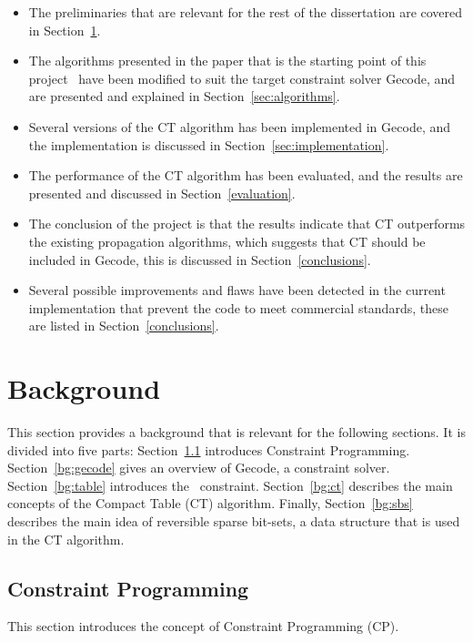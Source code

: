 \documentclass[a4paper,11pt]{article}
\newcommand{\Secref}[1]{Section~\ref{#1}}
\newcommand{\Table}{\Constraint{Table}}
\numberwithin{equation}{section}
\begin{document}
\begin{itemize}
  \item The preliminaries that are relevant for the rest of the dissertation
    are covered in \Secref{bg}.

  \item The algorithms presented in the paper that is the starting point of this 
    project~\cite{DBLP:conf/cp/DemeulenaereHLP16} 
    have been modified to suit the target constraint solver Gecode, and are presented and explained in 
    \Secref{sec:algorithms}.

  \item Several versions of the CT algorithm has been implemented in Gecode, and
    the implementation is discussed in \Secref{sec:implementation}.

  \item The performance of the CT algorithm has been evaluated,
    and the results
    are presented and discussed in \Secref{evaluation}.

  \item The conclusion of the project is that the results indicate
    that CT outperforms the existing propagation algorithms, which
    suggests that CT should be included in Gecode, this is discussed
    in \Secref{conclusions}.

  \item Several possible improvements and flaws have been detected in the current
    implementation that prevent the code to meet commercial standards, these
    are listed in \Secref{conclusions}.
        
\end{itemize}

\section{Background}
\label{bg}


This section provides a background that is relevant for the
following sections. It is divided into five parts: \Secref{bg:cp}
introduces Constraint Programming. \Secref{bg:gecode} gives an overview
of Gecode, a constraint solver. \Secref{bg:table} introduces the~\Table
constraint. \Secref{bg:ct} describes the main concepts of the Compact
Table (CT) algorithm. Finally, \Secref{bg:sbs} describes the main
idea of reversible sparse bit-sets,
a data structure that is used in the CT algorithm.

\subsection{Constraint Programming}
\label{bg:cp}
This section introduces the concept of Constraint Programming (CP).
\end{document}
